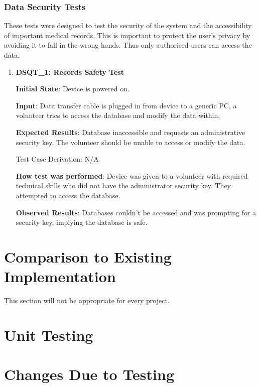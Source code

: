 \documentclass[12pt, titlepage]{article}
\begin{document}
\subsubsection{Data Security Tests}

These tests were designed to test the security of the system and the accessibility of important medical records. This is important to protect the user's privacy by avoiding it to fall in the wrong hands. Thus only authorised users can access the data.

\begin{enumerate}

  \item{\textbf{DSQT\_1: Records Safety Test}}\label{DSQT1}

  \textbf{Initial State}: Device is powered on.

  \textbf{Input}: Data transfer cable is plugged in from device to a generic PC, a volunteer tries to access the database and modify the data within.

  \textbf{Expected Results}: Database inaccessible and requests an administrative security key. The volunteer should be unable to access or modify the data.

  Test Case Derivation: N/A

  \textbf{How test was performed}: Device was given to a volunteer with required technical skills who did not have the administrator security key. They attempted to access the database.

  \textbf{Observed Results}: Databases couldn't be accessed and was prompting for a security key, implying the database is safe.

\end{enumerate}

\section{Comparison to Existing Implementation}

This section will not be appropriate for every project.

\section{Unit Testing}

\section{Changes Due to Testing}
\end{document}
